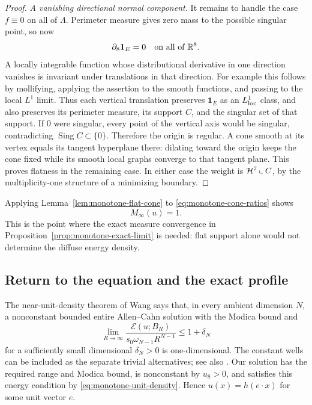 \begin{proof}
\emph{A vanishing directional normal component.}
It remains to handle the case $f\equiv0$ on all of $\Lambda$.
Perimeter measure gives zero mass to the possible singular point, so now
\begin{equation}
 \partial_8\mathbf1_E=0\quad\text{on all of }\mathbb R^8.
 \label{eq:monotone-vertical-invariance}
\end{equation}
A locally integrable function whose distributional derivative in one
direction vanishes is invariant under translations in that direction.
For example this follows by mollifying, applying the assertion to the
smooth functions, and passing to the local $L^1$ limit.  Thus each
vertical translation preserves $\mathbf1_E$ as an $L^1_{\rm loc}$
class, and also preserves its perimeter measure, its support $C$, and
the singular set of that support.  If $0$ were singular, every point of
the vertical axis would be singular, contradicting
$\operatorname{Sing}C\subset\{0\}$.  Therefore the origin is
regular.  A cone smooth at its vertex equals its tangent hyperplane
there: dilating toward the origin keeps the cone fixed while its smooth
local graphs converge to that tangent plane.  This proves flatness in
the remaining case.  In either case the weight is
$\mathcal H^7\mathbin\llcorner C$, by the multiplicity-one structure of a
minimizing boundary.
\end{proof}

Applying Lemma~\ref{lem:monotone-flat-cone} to
\eqref{eq:monotone-cone-ratios} shows
\begin{equation}
 M_\infty(u)=1.
 \label{eq:monotone-unit-density}
\end{equation}
This is the point where the exact measure convergence in
Proposition~\ref{prop:monotone-exact-limit} is needed: flat support
alone would not determine the diffuse energy density.

\subsection{Return to the equation and the exact profile}

The near-unit-density theorem of Wang
\citep[Theorem~11.1, p.~3036]{Wang2017} says that, in every ambient
dimension $N$, a nonconstant bounded entire Allen--Cahn solution with
the Modica bound and
\[
 \lim_{R\to\infty}\frac{\mathcal E(u;B_R)}
                           {s_0\omega_{N-1}R^{N-1}}
            \le1+\delta_N
\]
for a sufficiently small dimensional $\delta_N>0$ is one-dimensional.
The constant wells can be included as the separate trivial alternatives;
see also \citet[Theorem~2.16]{FSS2025}.  Our solution has the required
range and Modica bound, is nonconstant by $u_8>0$, and satisfies this
energy condition by \eqref{eq:monotone-unit-density}.  Hence
$u(x)=h(e\cdot x)$ for some unit vector $e$.

